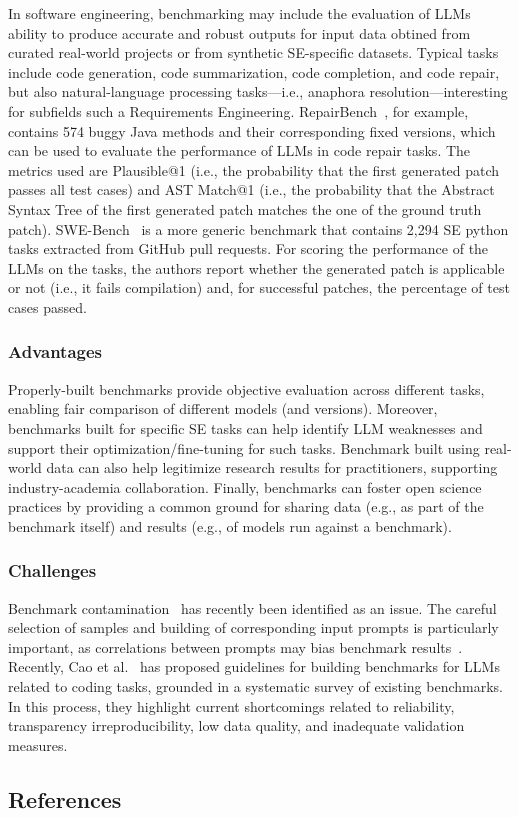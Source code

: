 \documentclass[11pt]{article}
\begin{document}
In software engineering, benchmarking may include the evaluation of LLMs ability to produce accurate and robust outputs for input data obtined from curated real-world projects or from synthetic SE-specific datasets. Typical tasks include code generation, code summarization, code completion, and code repair, but also natural-language processing tasks---i.e., anaphora resolution---interesting for subfields such a Requirements Engineering. 
RepairBench~\cite{silva2024repairbench}, for example, contains 574 buggy Java methods and their corresponding fixed versions, which can be used to evaluate the performance of LLMs in code repair tasks.
The metrics used are Plausible@1 (i.e., the probability that the first generated patch passes all test cases) and AST Match@1 (i.e., the probability that the Abstract Syntax Tree of the first generated patch matches the one of the ground truth patch).
SWE-Bench~\cite{DBLP:conf/iclr/JimenezYWYPPN24} is a more generic benchmark that contains 2,294 SE python tasks extracted from GitHub pull requests.
For scoring the performance of the LLMs on the tasks, the authors report whether the generated patch is applicable or not (i.e., it fails compilation) and, for successful patches, the percentage of test cases passed.

\subsubsection{Advantages}

Properly-built benchmarks provide objective evaluation across different tasks, enabling fair comparison of different models (and versions).
Moreover, benchmarks built for specific SE tasks can help identify LLM weaknesses and support their optimization/fine-tuning for such tasks.
Benchmark built using real-world data can also help legitimize research results for practitioners, supporting industry-academia collaboration.
Finally, benchmarks can foster open science practices by providing a common ground for sharing data (e.g., as part of the benchmark itself) and results (e.g., of models run against a benchmark).

\subsubsection{Challenges}

Benchmark contamination~\cite{DBLP:journals/corr/abs-2410-16186} has recently been identified as an issue.
The careful selection of samples and building of corresponding input prompts is particularly important, as correlations between prompts may bias benchmark results~\cite{DBLP:conf/acl/SiskaMAB24}.
Recently, Cao et al.~\cite{cao2025should} has proposed guidelines for building benchmarks for LLMs related to coding tasks, grounded in a systematic survey of existing benchmarks. 
In this process, they highlight current shortcomings related to reliability, transparency irreproducibility, low data quality, and inadequate validation measures.


\subsection{References}



\end{document}
